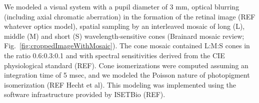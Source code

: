 \documentclass{jov}
\begin{document}
We modeled a visual system with a pupil diameter of 3 mm, optical blurring (including axial chromatic aberration) in the formation of the retinal image (REF whatever optics model), spatial sampling by an interleaved mosaic of long (L), middle (M)  and short (S) wavelength-sensitive cones (Brainard mosaic review; Fig.~\ref{fig:croppedImageWithMosaic}). The cone mosaic contained  L:M:S cones in the ratio 0.6:0.3:0.1 and with spectral sensitivities derived from the CIE physiological standard (REF).
Cone isomerizations were computed assuming an integration time of 5 msec, and we modeled the Poisson nature of photopigment isomerization (REF Hecht et al). This modeling was implemented using the software infrastructure provided by ISETBio (REF).

%

%

%

%
%

%
%
%

%
%
\end{document}
